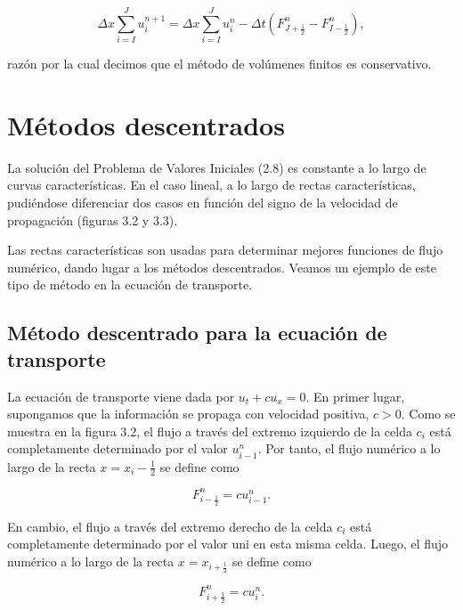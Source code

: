 \begin{equation*}
    \Delta x
    \sum_{i=I}^{J}
    u^{n+1}_{i}=
    \Delta x
    \sum_{i=I}^{J}
    u^{n}_{i}-
    \Delta t
    \left(
    F^{n}_{J+\frac{1}{2}}-
    F^{n}_{I-\frac{1}{2}}
    \right),
\end{equation*}

razón por la cual decimos que el método de volúmenes finitos es conservativo.

\section{Métodos descentrados}

La solución del Problema de Valores Iniciales (2.8) es constante a lo largo de curvas
características.
En el caso lineal, a lo largo de rectas características, pudiéndose diferenciar
dos casos en función del signo de la velocidad de propagación (figuras 3.2 y 3.3).


Las rectas características son usadas para determinar mejores
funciones de flujo numérico, dando lugar a los métodos descentrados.
Veamos un ejemplo de este tipo de método en la ecuación de transporte.

\subsection*{Método descentrado para la ecuación de transporte}

La ecuación de transporte viene dada por $u_{t}+cu_{x}=0$.
En primer lugar, supongamos que la información se propaga con
velocidad positiva, $c>0$.
Como se muestra en la figura 3.2, el flujo a través del extremo
izquierdo de la celda $c_{i}$ está completamente determinado por el
valor $u^{n}_{i-1}$.
Por tanto, el flujo numérico a lo largo de la recta
$x=x_{i}-\frac{1}{2}$ se define como

\begin{equation*}
    F^{n}_{i-\frac{1}{2}}=
    cu^{n}_{i-1}.
\end{equation*}

En cambio, el flujo a través del extremo derecho de la celda $c_{i}$
está completamente determinado por el valor uni en esta misma celda.
Luego, el flujo numérico a lo largo de la recta $x=x_{i+\frac{1}{2}}$
se define como

\begin{equation*}
    F^{n}_{i+\frac{1}{2}}=
    cu^{n}_{i}.
\end{equation*}

